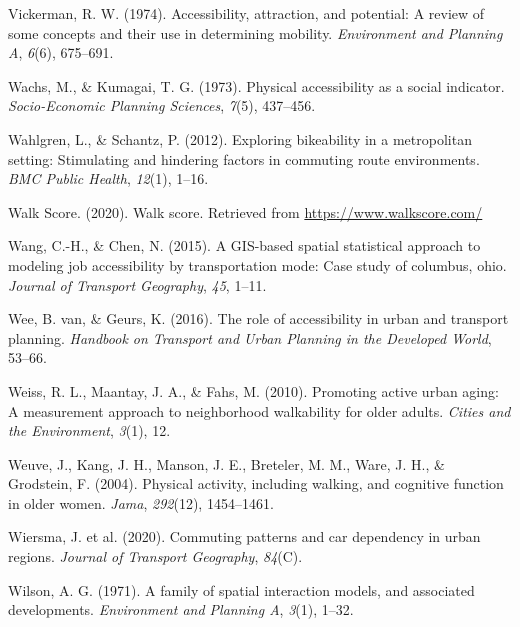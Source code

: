 \documentclass[
11pt, %
oneside, %
english, %
singlespacing, %
]{macthesis} %
\newlength{\cslhangindent}
\newenvironment{CSLReferences}[2] %
 {%
  \setlength{\parindent}{0pt}
  \ifodd #1 \everypar{\setlength{\hangindent}{\cslhangindent}}\ignorespaces\fi
  \ifnum #2 > 0
  \setlength{\parskip}{#2\baselineskip}
  \fi
 }%
 {}
\begin{document}
\begin{CSLReferences}{1}{0}
\leavevmode{}%
Vickerman, R. W. (1974). Accessibility, attraction, and potential: A review of some concepts and their use in determining mobility. \emph{Environment and Planning A}, \emph{6}(6), 675--691.

\leavevmode{}%
Wachs, M., \& Kumagai, T. G. (1973). Physical accessibility as a social indicator. \emph{Socio-Economic Planning Sciences}, \emph{7}(5), 437--456.

\leavevmode{}%
Wahlgren, L., \& Schantz, P. (2012). Exploring bikeability in a metropolitan setting: Stimulating and hindering factors in commuting route environments. \emph{BMC Public Health}, \emph{12}(1), 1--16.

\leavevmode{}%
Walk Score. (2020). Walk score. Retrieved from \url{https://www.walkscore.com/}

\leavevmode{}%
Wang, C.-H., \& Chen, N. (2015). A GIS-based spatial statistical approach to modeling job accessibility by transportation mode: Case study of columbus, ohio. \emph{Journal of Transport Geography}, \emph{45}, 1--11.

\leavevmode{}%
Wee, B. van, \& Geurs, K. (2016). The role of accessibility in urban and transport planning. \emph{Handbook on Transport and Urban Planning in the Developed World}, 53--66.

\leavevmode{}%
Weiss, R. L., Maantay, J. A., \& Fahs, M. (2010). Promoting active urban aging: A measurement approach to neighborhood walkability for older adults. \emph{Cities and the Environment}, \emph{3}(1), 12.

\leavevmode{}%
Weuve, J., Kang, J. H., Manson, J. E., Breteler, M. M., Ware, J. H., \& Grodstein, F. (2004). Physical activity, including walking, and cognitive function in older women. \emph{Jama}, \emph{292}(12), 1454--1461.

\leavevmode{}%
Wiersma, J. et al. (2020). Commuting patterns and car dependency in urban regions. \emph{Journal of Transport Geography}, \emph{84}(C).

\leavevmode{}%
Wilson, A. G. (1971). A family of spatial interaction models, and associated developments. \emph{Environment and Planning A}, \emph{3}(1), 1--32.


\end{CSLReferences}
\end{document}
